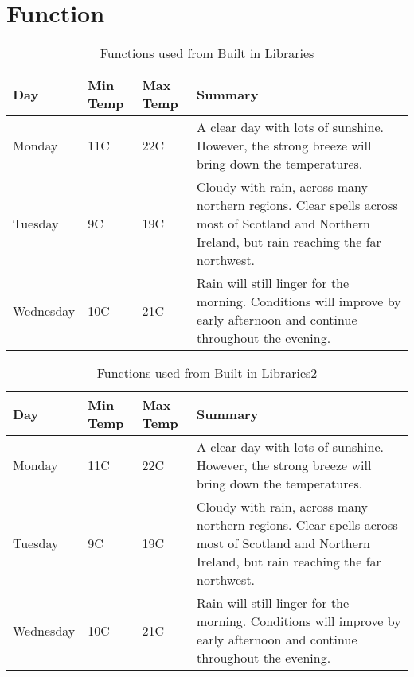 \chapter{Function}
\begin{table}[ht]
\centering
    \begin{tabular}{ | l | l | l | p{5cm} |}
    \hline
    Day & Min Temp & Max Temp & Summary \\ \hline
    Monday & 11C & 22C & A clear day with lots of sunshine.  
    However, the strong breeze will bring down the temperatures. \\ \hline
    Tuesday & 9C & 19C & Cloudy with rain, across many northern regions. Clear spells 
    across most of Scotland and Northern Ireland, 
    but rain reaching the far northwest. \\ \hline
    Wednesday & 10C & 21C & Rain will still linger for the morning. 
    Conditions will improve by early afternoon and continue 
    throughout the evening. \\
    \hline
    \end{tabular}
\caption{Functions used from Built in Libraries}
\label{tab:function}
\end{table}

\begin{table}[ht]
\centering
    \begin{tabular}{ | l | l | l | p{5cm} |}
    \hline
    Day & Min Temp & Max Temp & Summary \\ \hline
    Monday & 11C & 22C & A clear day with lots of sunshine.  
    However, the strong breeze will bring down the temperatures. \\ \hline
    Tuesday & 9C & 19C & Cloudy with rain, across many northern regions. Clear spells 
    across most of Scotland and Northern Ireland, 
    but rain reaching the far northwest. \\ \hline
    Wednesday & 10C & 21C & Rain will still linger for the morning. 
    Conditions will improve by early afternoon and continue 
    throughout the evening. \\
    \hline
    \end{tabular}
\caption{Functions used from Built in Libraries2}
\label{tab:function2}
\end{table}

